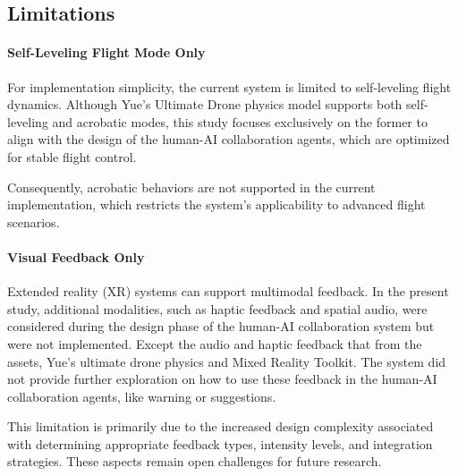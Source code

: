 \subsection*{Limitations}

\paragraph{Self-Leveling Flight Mode Only}

For implementation simplicity, the current system is limited to self-leveling flight dynamics. Although Yue's Ultimate Drone physics model supports both self-leveling and acrobatic modes, this study focuses exclusively on the former to align with the design of the human-AI collaboration agents, which are optimized for stable flight control.

Consequently, acrobatic behaviors are not supported in the current implementation, which restricts the system's applicability to advanced flight scenarios.

\paragraph{Visual Feedback Only}

Extended reality (XR) systems can support multimodal feedback. In the present study, additional modalities, such as haptic feedback and spatial audio, were considered during the design phase of the human-AI collaboration system but were not implemented. Except the audio and haptic feedback that from the assets, Yue's ultimate drone physics and Mixed Reality Toolkit. The system did not provide further exploration on how to use these feedback in the human-AI collaboration agents, like warning or suggestions.

This limitation is primarily due to the increased design complexity associated with determining appropriate feedback types, intensity levels, and integration strategies. These aspects remain open challenges for future research.
